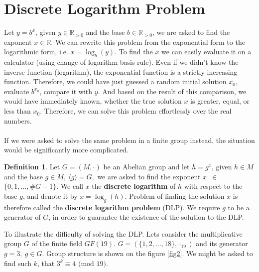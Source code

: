 \documentclass[thesis=M,english]{FITthesis}[2012/10/20]
\theoremstyle{remark}
\theoremstyle{definition}
\newtheorem{DF}{Definition}[section]
\begin{document}
\section{Discrete Logarithm Problem}
Let $y = b^x$, given $y \in \mathbb{R}_{> 0}$ and the base $b \in \mathbb{R}_{>0}$, we are asked to find the exponent $x \in \mathbb{R}$. We can rewrite this problem from the exponential form to the logarithmic form, i.e. $x = \log_b(y)$. To find the $x$ we can easily evaluate it on a calculator (using change of logarithm basis rule). Even if we didn't know the inverse function (logarithm), the exponential function is a strictly increasing function. Therefore, we could have just guessed a random initial solution $x_0$, evaluate $b^{x_0}$, compare it with $y$. And based on the result of this comparison, we would have immediately known, whether the true solution $x$ is greater, equal, or less than $x_0$. Therefore, we can solve this problem effortlessly over the real numbers.
\\
\\
\noindent If we were asked to solve the same problem in a finite group instead, the situation would be significantly more complicated.
\begin{DF}
Let $G = (M, \cdot)$ be an Abelian group and let $h = g^x$, given $h \in M$ and the base $g \in M,\ \langle g \rangle = G,$ we are asked to find the exponent $x$~$\in$~$\{0,1, \ldots, \#G - 1\}.$ We call $x$ the \textbf{discrete logarithm} of $h$ with respect to the base $g$, and denote it by $x= \log_g(h)$. Problem of finding the solution $x$ is therefore called the \textbf{discrete logarithm problem} (DLP). We require $g$ to be a generator of $G$, in order to guarantee the existence of the solution to the DLP. 
\end{DF}
\noindent To illustrate the difficulty of solving the DLP. Lets consider the multiplicative group $G$ of the finite field $GF(19).$ $G = (\{1,2,\ldots,18\}, \cdot_{19})$ and its generator $g=3,\ g \in G$. Group structure is shown on the figure \ref{fig2}. We might be asked to find such $k$, that $3^k \equiv 4 \text{ (mod 19)}$. 
\end{document}
